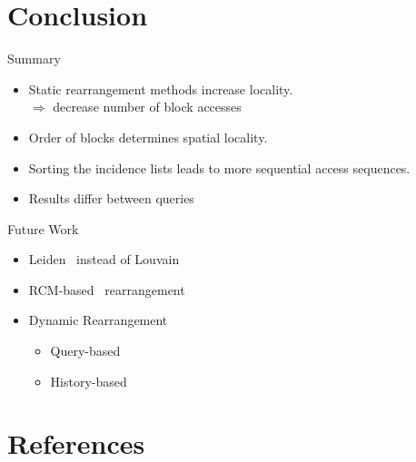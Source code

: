 \documentclass[rgb]{beamer}
\begin{document}
    \section{Conclusion}
        \begin{frame}{Summary}
            \begin{itemize}
                \item Static rearrangement methods increase locality. \\ [0.5em]
                $\Rightarrow$ decrease number of block accesses \\ [3em]
                \item Order of blocks determines spatial locality. \\ [3em]
                \item Sorting the incidence lists leads to more sequential access sequences. \\ [3em]
                \item Results differ between queries 
                \end{itemize}
        \end{frame}
    
        \begin{frame}{Future Work}
        \begin{itemize}
            \item Leiden~\autocite{traag2019louvain} instead of Louvain \\ [2em]
            \item RCM-based~\autocite{Cuthill1969ReducingTB} rearrangement \\ [2em]
            \item  Dynamic Rearrangement \\ [1.5em]
                \begin{itemize}
                 \item Query-based \\ [1em]
                 \item History-based 
                \end{itemize}

        \end{itemize}
        \end{frame}
        
\section{References}
    \begin{frame}[allowframebreaks]
    \nocite{*}
      \begin{tiny}
      \printbibliography
      \end{tiny}
    \end{frame}
\end{document}
